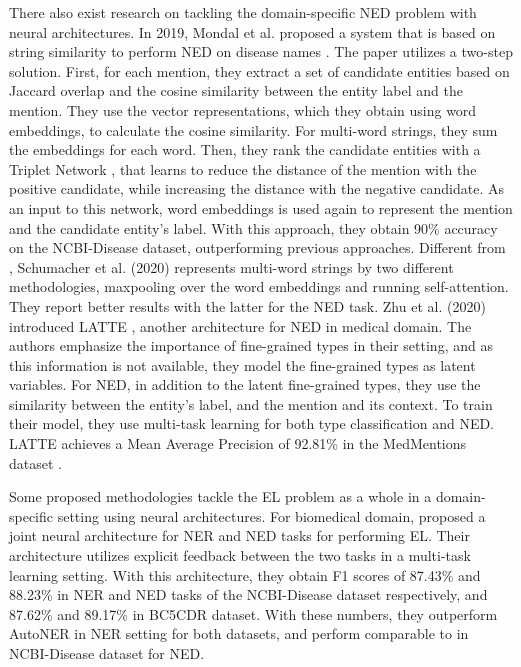 \documentclass{article}
\theoremstyle{definition}
\theoremstyle{remark}
\begin{document}
There also exist research on tackling the domain-specific NED problem with neural architectures. In 2019, Mondal et al. proposed a system that is based on string similarity to perform NED on disease names  \cite{MedicalTriplet}. The paper utilizes a two-step solution. First, for each mention, they extract a set of candidate entities based on Jaccard overlap and the cosine similarity between the entity label and the mention. They use the vector representations, which they obtain using word embeddings, to calculate the cosine similarity. For multi-word strings, they sum the embeddings for each word. Then, they rank the candidate entities with a Triplet Network \cite{tripletNetwork}, that learns to reduce the distance of the mention with the positive candidate, while increasing the distance with the negative candidate. As an input to this network, word embeddings is used again to represent the mention and the candidate entity's label. With this approach, they obtain 90\% accuracy on the NCBI-Disease \cite{ncbi} dataset, outperforming previous approaches.  Different from \cite{MedicalTriplet}, Schumacher et al. (2020) \cite{ClinicalConcept} represents multi-word strings by two different methodologies, maxpooling over the word embeddings and running self-attention. They report better results with the latter for the NED task.  Zhu et al. (2020) introduced LATTE \cite{latte}, another architecture for NED in medical domain. The authors emphasize the importance of fine-grained types in their setting, and as this information is not available, they model the fine-grained types as latent variables. For NED, in addition to the latent fine-grained types, they use the similarity between the entity's label, and the mention and its context. To train their model, they use multi-task learning for both type classification and NED. LATTE achieves a Mean Average Precision of 92.81\% in the MedMentions dataset \cite{medmentions}. 

Some proposed methodologies tackle the EL problem as a whole in a domain-specific setting using neural architectures. For biomedical domain, \cite{MedFeedback} proposed a joint neural architecture for NER and NED tasks for performing EL. Their architecture utilizes explicit feedback between the two tasks in a multi-task learning setting. With this architecture, they obtain F1 scores of 87.43\% and 88.23\% in NER and NED tasks of the NCBI-Disease \cite{ncbi} dataset respectively, and 87.62\% and 89.17\% in BC5CDR \cite{bc5cdr} dataset.  With these numbers, they outperform AutoNER \cite{NERDict2} in NER setting for both datasets, and perform comparable to \cite{MedicalTriplet} in NCBI-Disease dataset for NED.
\end{document}
